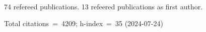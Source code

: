 74 refereed publications. 13 refeered publications as first author.

Total citations~=~4209; h-index~=~35 (2024-07-24)